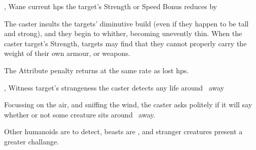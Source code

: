   {\mEarth,\mWater}%
  {Wane}%
  {\duplicated}%
  {current \glspl{hp}}%
  {the target's Strength or Speed Bonus reduces by }%
  {
    The caster insults the targets' diminutive build (even if they happen to be tall and strong), and they begin to whither, becoming unevently thin.
    When the caster target's Strength, targets may find that they cannot properly carry the weight of their own armour, or weapons.

    The Attribute penalty returns at the same rate as lost \glspl{hp}.
  }

  {\mEarth,\mWater}%
  {Witness}%
  {\distant}%
  {target's strangeness}%
  {the caster detects any life around \spellRange\ away}%
  {
    Focussing on the air, and sniffing the wind, the caster asks politely if it will say whether or not some creature sits around \spellRange\ away.

    Other humanoids are \tn[7] to detect, beasts are \tn[9], and stranger creatures present a greater challange.
  }

